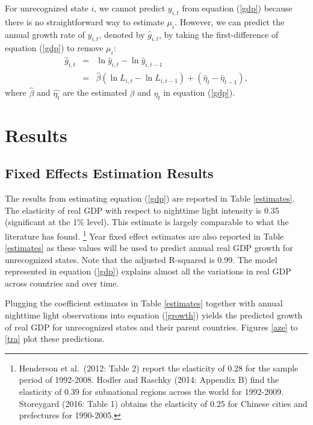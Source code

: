 \documentclass[12pt,a4paper]{article}%
\begin{document}
For unrecognized state $i$, we cannot predict $y_{i,t}$ from equation (\ref{gdp}) because there is no straightforward way to estimate $\mu_i$. However, we can predict the annual growth rate of $y_{i,t}$, denoted by $\hat{g}_{i,t}$, by taking the first-difference of equation (\ref{gdp}) to remove $\mu_i$:
\begin{eqnarray}\label{growth}
\hat{g}_{i,t} 
&=& \ln \hat{y}_{i,t} - \ln \hat{y}_{i, t-1} \nonumber \\
&=& \hat{\beta} (\ln L_{i,t} - \ln L_{i,t-1}) + (\hat{\eta}_t - \hat{\eta}_{t-1}),
\end{eqnarray}
where $\hat{\beta}$ and $\hat{\eta_t}$ are the estimated $\beta$ and $\eta_t$ in equation (\ref{gdp}).

\section{Results}
\subsection{Fixed Effects Estimation Results}
The results from estimating equation (\ref{gdp}) are reported in Table \ref{estimates}. 
The elasticity of real GDP with respect to nighttime light intensity is 0.35 (significant at the 1\% level).
This estimate is largely comparable to what the literature has found.%
\footnote{
	Henderson et al.\ (2012: Table 2) report the elasticity of 0.28 for the sample period of 1992-2008. Hodler and Raschky (2014: Appendix B) find the elasticity of 0.39 for subnational regions across the world for 1992-2009. Storeygard (2016: Table 1) obtains the elasticity of 0.25 for Chinese cities and prefectures for 1990-2005. 
}   
Year fixed effect estimates are also reported in Table \ref{estimates} as these values will be used to predict annual real GDP growth for unrecognized states. 
Note that the adjusted R-squared is 0.99. 
The model represented in equation (\ref{gdp}) explains almost all the variations in real GDP across countries and over time. 

Plugging the coefficient estimates in Table \ref{estimates} together with annual nighttime light observations into equation (\ref{growth}) yields the predicted growth of real GDP for unrecognized states and their parent countries. 
Figures \ref{aze} to \ref{tra} plot these predictions.
\end{document}

